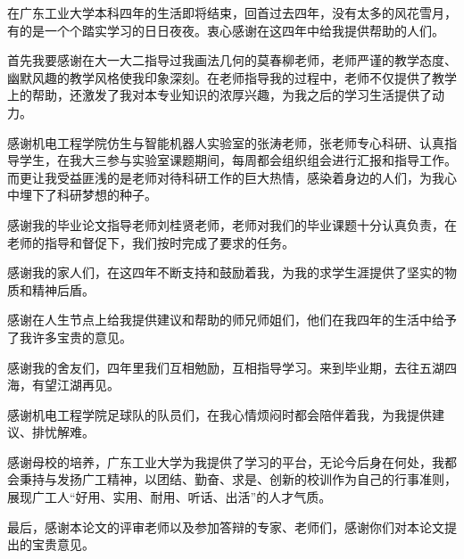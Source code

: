 在广东工业大学本科四年的生活即将结束，回首过去四年，没有太多的风花雪月，有的是一个个踏实学习的日日夜夜。衷心感谢在这四年中给我提供帮助的人们。\par
首先我要感谢在大一大二指导过我画法几何的莫春柳老师，老师严谨的教学态度、幽默风趣的教学风格使我印象深刻。在老师指导我的过程中，老师不仅提供了教学上的帮助，还激发了我对本专业知识的浓厚兴趣，为我之后的学习生活提供了动力。\par
感谢机电工程学院仿生与智能机器人实验室的张涛老师，张老师专心科研、认真指导学生，在我大三参与实验室课题期间，每周都会组织组会进行汇报和指导工作。而更让我受益匪浅的是老师对待科研工作的巨大热情，感染着身边的人们，为我心中埋下了科研梦想的种子。\par
感谢我的毕业论文指导老师刘桂贤老师，老师对我们的毕业课题十分认真负责，在老师的指导和督促下，我们按时完成了要求的任务。\par
感谢我的家人们，在这四年不断支持和鼓励着我，为我的求学生涯提供了坚实的物质和精神后盾。\par
感谢在人生节点上给我提供建议和帮助的师兄师姐们，他们在我四年的生活中给予了我许多宝贵的意见。\par
感谢我的舍友们，四年里我们互相勉励，互相指导学习。来到毕业期，去往五湖四海，有望江湖再见。\par
感谢机电工程学院足球队的队员们，在我心情烦闷时都会陪伴着我，为我提供建议、排忧解难。\par
感谢母校的培养，广东工业大学为我提供了学习的平台，无论今后身在何处，我都会秉持与发扬广工精神，以团结、勤奋、求是、创新的校训作为自己的行事准则，展现广工人“好用、实用、耐用、听话、出活”的人才气质。\par
最后，感谢本论文的评审老师以及参加答辩的专家、老师们，感谢你们对本论文提出的宝贵意见。